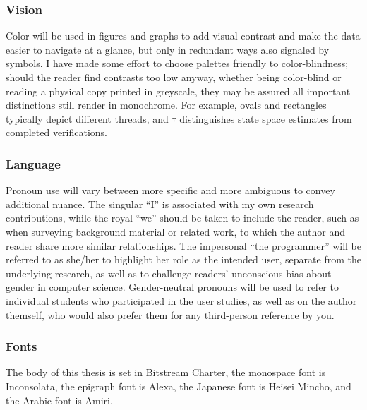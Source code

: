 \subsubsection{Vision}

Color will be used in figures and graphs to add visual contrast and make the data easier to navigate at a glance,
but only in redundant ways also signaled by symbols.
I have made some effort to choose palettes friendly to color-blindness;
should the reader find contrasts too low anyway,
whether being color-blind or reading a physical copy printed in greyscale,
they may be assured all important distinctions still render in monochrome.
For example, ovals and rectangles typically depict different threads,
and $\dagger$ distinguishes state space estimates from completed verifications.

\subsubsection{Language}

Pronoun use will vary between more specific and more ambiguous to convey additional nuance.
The singular ``I'' is associated with my own research contributions,
while the royal ``we'' should be taken to include the reader,
such as when surveying background material or related work,
to which the author and reader share more similar relationships.
The impersonal ``the programmer'' will be referred to as she/her
to highlight her role as the intended user, separate from the underlying research,
as well as to challenge readers' unconscious bias about gender in computer science.
Gender-neutral pronouns will be used to refer to
individual students who participated in the user studies,
as well as
on the author themself,
who would also prefer them for any third-person reference by you.

\subsubsection{Fonts}

The body of this thesis is set in Bitstream Charter,
the monospace font is Inconsolata,
the epigraph font is Alexa, %
the Japanese font is Heisei Mincho, %
and
the Arabic font is Amiri. %

